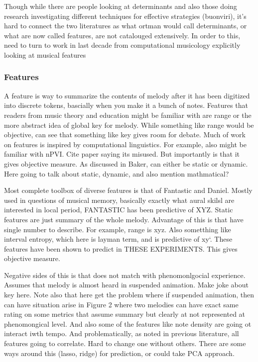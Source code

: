 \documentclass[english,man,floatsintext]{apa6}
\begin{document}
Though while there are people looking at determinants and also those doing research investigating different techniques for effective strategies (buonviri), it's hard to connect the two literatures as what ortman would call determinants, or what are now called features, are not catalouged extensively.
In order to this, need to turn to work in last decade from computational musicology explicitly looking at musical features

\hypertarget{features}{%
\subsubsection{Features}\label{features}}

A feature is way to summarize the contents of melody after it has been digitized into discrete tokens, bascially when you make it a bunch of notes.
Features that readers from music theory and education might be familiar with are range or the more abstract idea of global key for melody.
While something like range would be objective, can see that something like key gives room for debate.
Much of work on features is inspired by computational linguistics.
For example, also might be familiar with nPVI.
Cite paper saying its misused.
But importantly is that it gives objective measure.
As discussed in Baker, can either be static or dynamic.
Here going to talk about static, dynamic, and also mention mathmatical?

Most complete toolbox of diverse features is that of Fantastic and Daniel.
Mostly used in questions of musical memory, basically exactly what aural skilsl are interested in local period, FANTASTIC has been predictive of XYZ.
Static features are just summary of the whole melody.
Advantage of this is that have single number to describe.
For example, range is xyz.
Also sometthing like interval entropy, which here is layman term, and is predictive of xy`.
These features have been shown to predict in THESE EXPERIMENTS.
This gives objective measure.

Negative sides of this is that does not match with phenomonlgocial experience.
Assumes that melody is almost heard in suspended animation.
Make joke about key here.
Note also that here get the problem where if suspended animation, then can have situation arise in Figure 2 where two melodies can have exact same rating on some metrics that assume summary but clearly at not represented at phenomongical level.
And also some of the features like note density are going ot interact iwth tempo.
And problematically, as noted in previous literature, all features going to correlate.
Hard to change one without others.
There are some ways around this (lasso, ridge) for prediction, or could take PCA approach.
\end{document}
